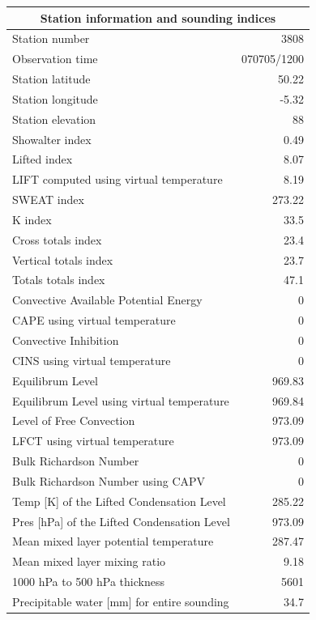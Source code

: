 \documentclass{article}
\begin{document}
\begin{longtable}{l|r}
\multicolumn{2}{c}{\textbf{Station information and sounding indices}
}\\ \hline
Station number & 3808 \\
Observation time & \multicolumn{1}{l}{ 070705/1200} \\
Station latitude & 50.22 \\
Station longitude & -5.32 \\
Station elevation & 88 \\
Showalter index & 0.49 \\
Lifted index & 8.07 \\
LIFT computed using virtual temperature & 8.19 \\
SWEAT index & 273.22 \\
K index & 33.5 \\
Cross totals index & 23.4 \\
Vertical totals index & 23.7 \\
Totals totals index & 47.1 \\
Convective Available Potential Energy & 0 \\
CAPE using virtual temperature & 0 \\
Convective Inhibition & 0 \\
CINS using virtual temperature & 0 \\
Equilibrum Level & 969.83 \\
Equilibrum Level using virtual temperature & 969.84 \\
Level of Free Convection & 973.09 \\
LFCT using virtual temperature & 973.09 \\
Bulk Richardson Number & 0 \\
Bulk Richardson Number using CAPV & 0 \\
Temp [K] of the Lifted Condensation Level & 285.22 \\
Pres [hPa] of the Lifted Condensation Level & 973.09 \\
Mean mixed layer potential temperature & 287.47 \\
Mean mixed layer mixing ratio & 9.18 \\
1000 hPa to 500 hPa thickness & 5601 \\
Precipitable water [mm] for entire sounding & 34.7 \\
\end{longtable}%

\newpage
\end{document}
